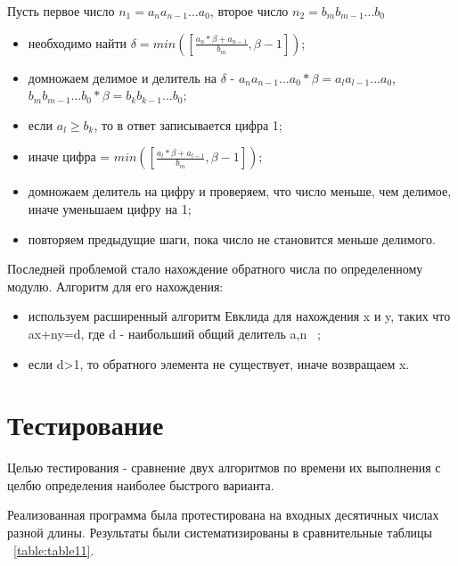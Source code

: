 \documentclass[14pt, russian]{scrartcl}
\begin{document}
Пусть первое число $n_{1}=a_{n}a_{n-1}...a_{0}$, второе число $n_{2}=b_{m}b_{m-1}...b_{0}$
\begin{itemize}
    \item необходимо найти $\delta=min([\frac{a_{n}*\beta+a_{n-1}}{b_{m}},\beta-1])$;
    \item домножаем делимое и делитель на $\delta$ - $a_{n}a_{n-1}...a_{0}*\beta=a_{l}a_{l-1}...a_{0}$, $b_{m}b_{m-1}...b_{0}*\beta=b_{k}b_{k-1}...b_{0}$;
    \item если $a_{l}\geq b_{k}$, то в ответ записывается цифра 1;
    \item иначе цифра = $ min([\frac{a_{l}*\beta+a_{l-1}}{b_{m}},\beta-1])$;
    \item домножаем делитель на цифру и проверяем, что число меньше, чем делимое, иначе уменьшаем цифру на 1;
    \item повторяем предыдущие шаги, пока число не становится меньше делимого.
\end{itemize}

Последней проблемой стало нахождение обратного числа по определенному модулю.
Алгоритм для его нахождения:
\begin{itemize}
    \item используем расширенный алгоритм Евклида для нахождения x и y, таких что ax+ny=d, где d - наибольший общий делитель a,n ~\cite{Euclid};
    \item если d>1, то обратного элемента не существует, иначе возвращаем x.
\end{itemize}

\section{Тестирование}
Целью тестирования - сравнение двух алгоритмов по времени их выполнения с целбю определения наиболее быстрого варианта. 

Реализованная программа была протестирована на входных десятичных числах разной длины. Результаты были систематизированы в сравнительные таблицы ~\ref{table:table11}.
\end{document}
